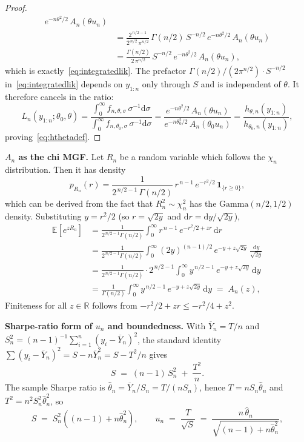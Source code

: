 \documentclass[numsec,webpdf,modern,medium,namedate]{oup-authoring-template}
\theoremstyle{thmstyleone}%
\theoremstyle{thmstyletwo}%
\theoremstyle{thmstylethree}%
\newcommand{\E}{\mathbb{E}}
\newcommand{\diff}{\mathrm{d}}
\newcommand{\1}{\mathbf{1}}
\begin{document}
\begin{appendices}
\begin{proof}
\begin{align*}
   e^{-n\theta^{2}/2}\,A_n(\theta u_n)\\
&= \frac{2^{\,n/2-1}}{2^{\,n/2}\,\pi^{n/2}}\,\Gamma(n/2)\,S^{-n/2}\,
   e^{-n\theta^{2}/2}\,A_n(\theta u_n)\\
&= \frac{\Gamma(n/2)}{2\,\pi^{n/2}}\,S^{-n/2}\,
   e^{-n\theta^{2}/2}\,A_n(\theta u_n),
\end{align*}
which is exactly~\eqref{eq:integratedlik}. The prefactor $\Gamma(n/2)/(2\pi^{n/2})\cdot S^{-n/2}$
in~\eqref{eq:integratedlik} depends on $y_{1:n}$ only through $S$ and is independent of $\theta$. It therefore cancels in the ratio:
\[
L_n(y_{1:n};\theta_0,\theta)
=\frac{\int_{0}^{\infty}\! f_{n,\theta,\sigma}\,\sigma^{-1}\diff\sigma}
      {\int_{0}^{\infty}\! f_{n,\theta_0,\sigma}\,\sigma^{-1}\diff\sigma}
=\frac{e^{-n\theta^{2}/2}\,A_n(\theta u_n)}
      {e^{-n\theta_0^{2}/2}\,A_n(\theta_0 u_n)}
=\frac{h_{\theta,n}(y_{1:n})}{h_{\theta_0,n}(y_{1:n})},
\]
proving~\eqref{eq:hthetadef}. 
\end{proof}

\textbf{$A_n$ as the chi MGF.} Let $R_n$ be a random variable which follows the $\chi_n$ distribution. Then it has density
\[
p_{R_n}(r)
=\frac{1}{2^{\,n/2-1}\,\Gamma(n/2)}\,
  r^{\,n-1}\,e^{-r^{2}/2}\,\1_{\{r\geq 0\}},
\]
which can be derived from the fact that $R_n^{2}\sim\chi^{2}_n$ has the $\mathrm{Gamma}(n/2,1/2)$ density. Substituting
$y=r^{2}/2$ (so $r=\sqrt{2y}$ and $\diff r=\diff y/\sqrt{2y}$),
\allowdisplaybreaks
\begin{align*}
\E\!\left[e^{zR_n}\right]
&=\frac{1}{2^{\,n/2-1}\Gamma(n/2)}
  \int_{0}^{\infty}\! r^{\,n-1}\,e^{-r^{2}/2 + zr}\,\diff r\\
&=\frac{1}{2^{\,n/2-1}\Gamma(n/2)}
  \int_{0}^{\infty}\! (2y)^{(n-1)/2}\,e^{-y+z\sqrt{2y}}\,\frac{\diff y}{\sqrt{2y}}\\
&=\frac{1}{2^{\,n/2-1}\Gamma(n/2)}\cdot 2^{\,n/2-1}
  \int_{0}^{\infty}\! y^{\,n/2-1}\,e^{-y+z\sqrt{2y}}\,\diff y\\
&=\frac{1}{\Gamma(n/2)}
  \int_{0}^{\infty}\! y^{\,n/2-1}\,e^{-y+z\sqrt{2y}}\,\diff y
  \;=\; A_n(z),
\end{align*}
Finiteness for all $z\in\mathbb{R}$ follows from $-r^{2}/2+zr\leq -r^{2}/4+z^{2}$.

\textbf{Sharpe-ratio form of $u_n$ and boundedness.} With $\overline{Y}_n=T/n$ and
$S_n^{2}=(n-1)^{-1}\sum_{i=1}^{n}(y_i-\overline{Y}_n)^{2}$, the standard
identity $\sum(y_i-\overline{Y}_n)^{2}=S-n\overline{Y}_n^{2}=S-T^{2}/n$
gives
\[
S \;=\; (n-1)\,S_n^{2} \;+\; \frac{T^{2}}{n}.
\]
The sample Sharpe ratio is
$\widehat{\theta}_n=\overline{Y}_n/S_n=T/(nS_n)$, hence
$T=nS_n\widehat{\theta}_n$ and $T^{2}=n^{2}S_n^{2}\widehat{\theta}_n^{2}$, so
\[
S \;=\; S_n^{2}\!\left((n-1)+n\widehat{\theta}_n^{2}\right),
\qquad
u_n \;=\; \frac{T}{\sqrt{S}}
\;=\; \frac{n\,\widehat{\theta}_n}{\sqrt{(n-1)+n\widehat{\theta}_n^{2}}},
\]



\end{appendices}
\end{document}
